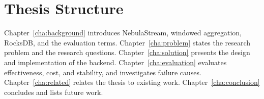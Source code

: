\section{Thesis Structure\label{sec:structure}}

Chapter~\ref{cha:background} introduces NebulaStream, windowed aggregation, RocksDB, and the evaluation terms.
Chapter~\ref{cha:problem} states the research problem and the research questions.
Chapter~\ref{cha:solution} presents the design and implementation of the backend.
Chapter~\ref{cha:evaluation} evaluates effectiveness, cost, and stability, and investigates failure causes.
Chapter~\ref{cha:related} relates the thesis to existing work.
Chapter~\ref{cha:conclusion} concludes and lists future work.
